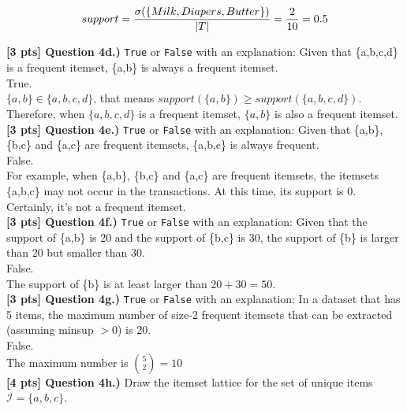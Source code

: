 \documentclass[paper=a4, fontsize=11pt]{scrartcl} %
\begin{document}
$$
support = \frac{\sigma(\{Milk,Diapers,Butter\})}{|T|} \\
=\frac{2}{10} = 0.5\\
$$

\textbf{[3 pts] Question 4d.)} \verb"True" or \verb"False" with an explanation: Given that \{a,b,c,d\} is a frequent itemset, \{a,b\} is always a frequent itemset. \\
True. \\
$\{a,b\}\in \{a,b,c,d\}$, that means $support(\{a,b\})\geq support(\{a,b,c,d\})$. Therefore, when $\{a,b,c,d\}$ is a frequent itemset, $\{a,b\}$ is also a frequent itemset.\\



\textbf{[3 pts] Question 4e.)} \verb"True" or \verb"False" with an explanation: Given that \{a,b\}, \{b,c\} and \{a,c\} are frequent itemsets, \{a,b,c\} is always frequent. \\
False.\\
For example, when  \{a,b\}, \{b,c\} and \{a,c\} are frequent itemsets, the itemsets \{a,b,c\} may not occur in the transactions. At this time, its support is 0. Certainly, it's not a frequent itemset. \\ 


\textbf{[3 pts] Question 4f.)} \verb"True" or \verb"False" with an explanation: Given that the support of \{a,b\} is 20 and the support of \{b,c\} is 30, the support of \{b\} is larger than 20 but smaller than 30. \\
False.      \\
The support of \{b\} is at least larger than $20+30=50$. \\


\textbf{[3 pts] Question 4g.)} \verb"True" or \verb"False" with an explanation: In a dataset that has 5 items, the maximum number of size-2 frequent itemsets that can be extracted (assuming minsup $> 0$) is 20. \\
False. \\
The maximum number is $\binom{5}{2}=10$ \\

\textbf{[4 pts] Question 4h.)} Draw the itemset lattice for the set of unique items $\mathcal{I} = \{ a, b, c \}$. \\
\end{document}
